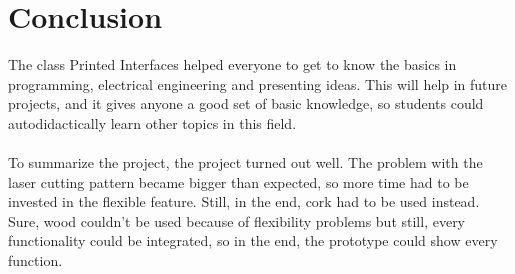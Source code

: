 \documentclass[00_doc.tex]{subfiles}
\begin{document}
    \section{Conclusion}
    \begin{flushleft}
        The class Printed Interfaces helped everyone to get to know the basics in programming,
        electrical engineering and presenting ideas. This will help in future projects, and it gives 
        anyone a good set of basic knowledge, so students could autodidactically learn other 
        topics in this field.\\~\\

        To summarize the project, the project turned out well. The problem with the laser 
        cutting pattern became bigger than expected, so more time had to be invested in the 
        flexible feature. Still, in the end, cork had to be used instead. Sure, wood couldn't 
        be used because of flexibility problems but still, every functionality could be 
        integrated, so in the end, the prototype could show every function.
    \end{flushleft}
\end{document}
